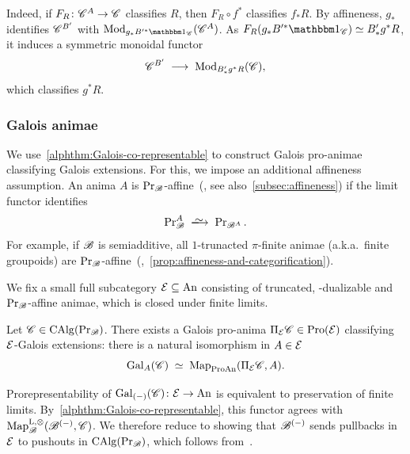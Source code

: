 \documentclass[english,svgnames,table]{article}
\begin{document}
    Indeed, if $F_R \colon \mathscr{C}^A \to \mathscr{C}$ classifies $R$, then $F_R \circ f^*$ classifies $f_*R$.
    By affineness, $g_*$ identifies $\mathscr{C}^{B'}$ with $\Mod_{g_*B'^*\ounit_{\cC}}(\cC^A)$.
    As $F_R(g_*B'^*\ounit_{\cC}) \simeq B'_*g^*R$, it induces a symmetric monoidal functor
    \begin{equation*}
        \mathscr{C}^{B'} \;\longrightarrow\; \operatorname{Mod}_{B'_*g^*R}(\mathscr{C}),
    \end{equation*}
    which classifies $g^*R$.


    \subsubsection*{Galois animae}

    We use~\cref{alphthm:Galois-co-representable} to construct Galois pro-animae classifying Galois extensions.
    For this, we impose an additional affineness assumption.
    An anima $A$ is $\operatorname{Pr}_{\mathscr{B}}$-affine~(\cite[Definition~2.1]{BCSY-Fourier}, see also~\cref{subsec:affineness}) if the limit functor identifies
    \begin{equation*}
        \ModB^A \;\isotoo\; \ModC[\basecat^A].
    \end{equation*}
    For example, if $\mathscr{B}$ is semiadditive, all $1$-trunacted $\pi$-finite animae (a.k.a.\ finite groupoids) are $\operatorname{Pr}_{\mathscr{B}}$-affine~(\cite[Example~2.35]{BCSY-Fourier},~\cref{prop:affineness-and-categorification}).

    We fix a small full subcategory $\mathcal{E} \subseteq \mathrm{An}$ consisting of truncated, \COB-dualizable and $\operatorname{Pr}_{\mathscr{B}}$-affine animae, which is closed under finite limits.


    \begin{alphThm}
    \label{alphthm:prorepresentability}
        Let $\mathscr{C} \in \operatorname{CAlg}(\operatorname{Pr}_{\mathscr{B}})$. There exists a Galois pro-anima $\Pi_{\mathcal{E}} \mathscr{C} \in \operatorname{Pro}(\mathcal{E})$ classifying $\mathcal{E}$-Galois extensions: there is a natural isomorphism in $A \in \mathcal{E}$
        \begin{equation*}
            \mathrm{Gal}_A(\mathscr{C}) \;\simeq\; \operatorname{Map}_{\mathrm{ProAn}}(\Pi_{\mathcal{E}} \mathscr{C}, A).
        \end{equation*}
    \end{alphThm}


    Prorepresentability of $\mathrm{Gal}_{(-)}(\mathscr{C}) \colon \mathcal{E} \to \mathrm{An}$ is equivalent to preservation of finite limits.
    By~\cref{alphthm:Galois-co-representable}, this functor agrees with $\operatorname{Map}^{\mathrm{L},\otimes}_{\mathscr{B}}(\mathscr{B}^{(-)},\mathscr{C})$.
    We therefore reduce to showing that $\mathscr{B}^{(-)}$ sends pullbacks in $\mathcal{E}$ to pushouts in $\operatorname{CAlg}(\operatorname{Pr}_{\mathscr{B}})$, which follows from~\cite[Theorem~2.38]{BCSY-Fourier}. 
\end{document}
